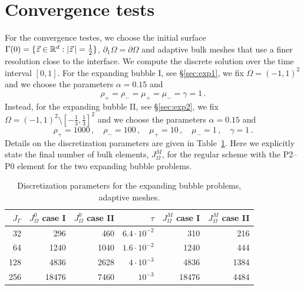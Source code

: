 \section{Convergence tests}\label{sec:ns_convergence_results}
For the convergence testes, we choose the initial surface $\Gamma(0) = \{ \vec
z \in \mathbb R^d : |\vec z\,| = \frac12 \}$, $\partial_1\Omega=\partial\Omega$ and
adaptive bulk meshes that use a finer resolution close to the interface. We
compute the discrete solution over the time interval $[0,1]$. For the expanding
bubble I, see \S\ref{sec:exp1}, we fix $\Omega = (-1,1)^2$ and we choose the
parameters $\alpha =0.15$ and
\begin{equation}
\rho_+ = \rho_- = \mu_+ = \mu_- = \gamma = 1\,.
\end{equation}
Instead, for the expanding bubble II, see \S\ref{sec:exp2}, we fix
$\Omega = (-1,1)^2 \setminus[-\frac13,\frac13]^2$ and we choose the parameters
$\alpha=0.15$ and
\begin{equation}
\rho_+ = 1000\,,\quad \rho_- = 100\,,\quad \mu_+ = 10\,,\quad \mu_- = 1\,,\quad
\gamma = 1\,.
\end{equation}
Details on the discretization parameters are given in
Table~\ref{tab:nsexpandingbubbleelements}. Here we explicitly state the final
number of bulk elements, $J_\Omega^M$, for the regular scheme with the P2--P0
element for the two expanding bubble problems.
\begin{table}
\center
\begin{tabular}{rrrrrr}
\hline
$J_\Gamma$ & $J_\Omega^0$ case I & $J_\Omega^0$ case II & $\tau$ &
$J_\Omega^M$ case I & $J_\Omega^M$ case II\\
\hline
 32 &   296 &  460 & $6.4\cdot10^{-2}$ &   310 &  216 \\
 64 &  1240 & 1040 & $1.6\cdot10^{-2}$ &  1240 &  444 \\
128 &  4836 & 2628 &   $4\cdot10^{-3}$ &  4836 & 1384 \\
256 & 18476 & 7460 &         $10^{-3}$ & 18476 & 4484 \\
\hline
\end{tabular}
\caption[Navier--Stokes expanding bubble meshes parameters]
{Discretization parameters for the expanding bubble problems, adaptive meshes.}
\label{tab:nsexpandingbubbleelements}
\end{table}

